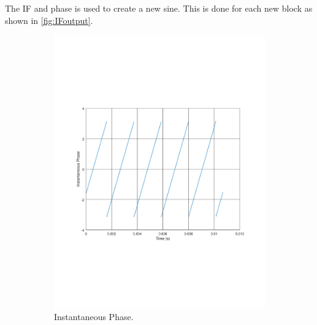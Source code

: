 The IF and phase is used to create a new sine.
This is done for each new block as shown in \cref{fig:IFoutput}.

\begin{figure}
	\centering
	\begin{subfigure}[t]{.5\textwidth}
		\centering
		\includegraphics[width=.9\linewidth, clip, trim={2cm 7cm 2cm 7cm}]{gfx/Modelling/IFIP.pdf}
		\caption{Instantaneous Phase.}
		\label{fig:IFsub1}
	\end{subfigure}%
	\begin{subfigure}[t]{.5\textwidth}
		\centering

\end{subfigure}
\end{figure}
